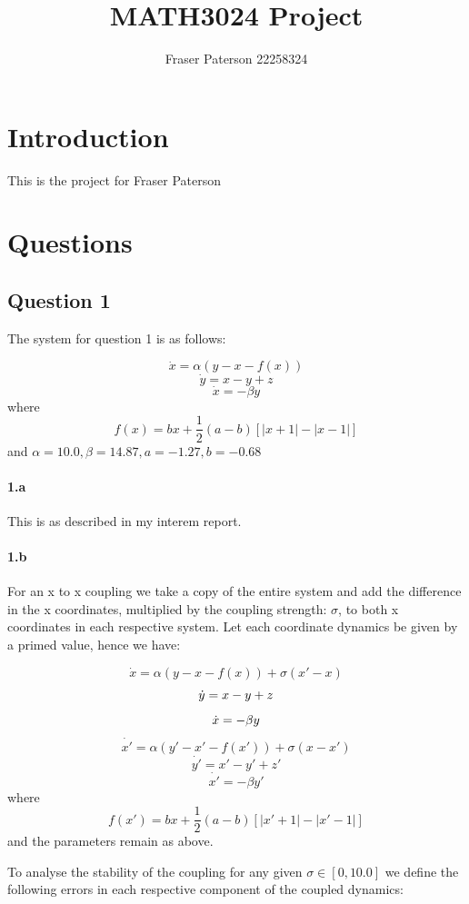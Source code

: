 \documentclass{article}
\author{Fraser Paterson 22258324}
\title{MATH3024 Project}
\begin{document}
\maketitle

\section*{Introduction}

This is the project for Fraser Paterson

\section*{Questions}

\subsection*{Question 1}

The system for question 1 is as follows:

$$\dot{x} = \alpha(y - x - f(x))$$
$$\dot{y} = x - y + z$$
$$\dot{x} = -\beta y$$
where
$$f(x) = bx + \frac{1}{2}(a - b)[|x + 1| - |x - 1|]$$
and $\alpha = 10.0, \beta = 14.87, a = -1.27, b = -0.68$

\paragraph{1.a} This is as described in my interem report.

\paragraph{1.b} For an x to x coupling we take a copy of the entire system and add the
difference in the x coordinates, multiplied by the coupling strength: $\sigma$, to both x coordinates
in each respective system. Let each coordinate dynamics
be given by a primed value, hence we have:

$$\dot{x} = \alpha(y - x - f(x)) + \sigma(x' - x)$$
$$\dot{y} = x - y + z\newline$$
$$\dot{x} = -\beta y\newline$$
$$\dot{x'} = \alpha(y' - x' - f(x')) +\sigma(x - x')$$
$$\dot{y'} = x' - y' + z'$$
$$\dot{x'} = -\beta y'$$
where
$$f(x') = bx + \frac{1}{2}(a - b)[|x' + 1| - |x' - 1|]$$
and the parameters remain as above.

To analyse the stability of the coupling for any given $\sigma \in [0, 10.0]$ we define the following
errors in each respective component of the coupled dynamics:
\end{document}
